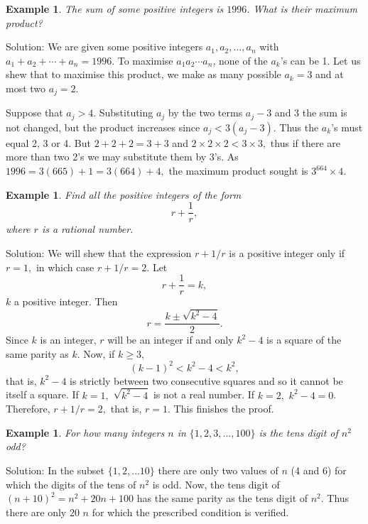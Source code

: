 \documentclass[11pt, openany]{book}
\theoremstyle{change} \theoremheaderfont{\blue\sffamily\bfseries}
\newtheorem{exa}[thm]{Example}
\theoremstyle{nonumberplain} \theoremheaderfont{\sffamily\bfseries}
\newcommand{\í}{\'{\i}}
\begin{document}
\begin{exa} The sum of  some positive integers is $1996$. What is their maximum product?\end{exa}
Solution: We are given some positive integers $a_1, a_2, \ldots ,
a_n$ with $a_1 + a_2 + \cdots + a_n = 1996.$ To maximise
$a_1a_2\cdots a_n$, none of the $a_k$'s can be 1. Let us shew that
to maximise this product, we make as many possible $a_k = 3$ and
at most two $a_j = 2.$



Suppose that $a_j > 4.$ Substituting $a_j$ by the two terms $a_j -
3$ and 3 the sum is not changed, but the product increases since
$a_j < 3(a_j - 3).$ Thus the  $a_k$'s must equal 2, 3 or 4. But $2
+ 2 + 2 = 3 + 3$ and $2 \times 2 \times 2 < 3\times 3,$ thus if
there are more than two 2's we may substitute them by 3's. As
$1996 = 3(665) + 1 = 3(664) + 4,$ the maximum product sought is
$3^{664}\times 4.$
\begin{exa} Find all the positive integers of the form
$$r + \frac{1}{r},$$where $r$ is a rational number.\end{exa}
Solution: We will shew that the expression $r + 1/r$ is a positive
integer only if  $r = 1,$ in which case $r + 1/r = 2.$ Let
$$r + \frac{1}{r} = k,$$ $k$ a positive integer. Then
$$r = \frac{k \pm \sqrt{k^2 - 4}}{2}.$$Since $k$ is an integer, $r$ will be an integer
if and only $k^2 - 4$ is a square of the same parity as $k$. Now,
if $k \geq 3,$
$$ (k - 1)^2 < k^2 - 4 < k^2,$$that is, $k^2 - 4$ is strictly between two consecutive squares and so
it cannot be itself a square. If $k = 1,$ $\sqrt{k^2 - 4}$ is not
a real number. If $k = 2,$ $k^2 - 4 = 0$. Therefore, $r + 1/r =
2,$ that is, $r = 1.$ This finishes the proof.
\begin{exa}
For how many integers $n$ in $\{1, 2, 3, \ldots , 100\}$ is the
tens digit of $n^2$ odd?
\end{exa}
Solution: In the subset $\{1, 2, \ldots 10\}$ there are only two
values of $n$ (4 and 6) for which the digits of the tens of $n^2$
is odd. Now, the tens digit of $(n + 10)^2 = n^2 + 20n + 100$ has
the same parity as the tens digit of $n^2$. Thus there are only 20
$n$ for which the prescribed condition is verified.
\end{document}
